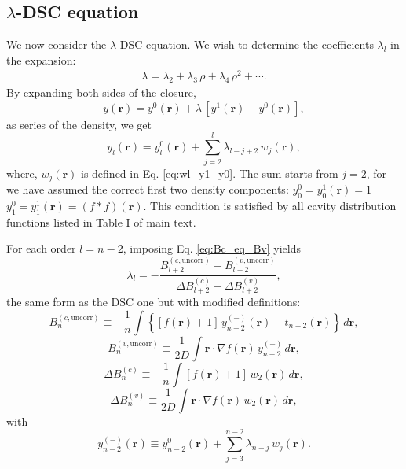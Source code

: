 \documentclass[aip,jcp,preprint,superscriptaddress,showpacs,preprintnumbers,amsmath,amssymb]{revtex4-1}
\numberwithin{equation}{section}
\newcommand{\vct}[1]{\mathbf{#1}}
\providecommand{\vr}{} %
\renewcommand{\vr}{\vct{r}}
\begin{document}
\subsection{$\lambda$-DSC equation}





We now consider the $\lambda$-DSC equation.
%
We wish to determine the coefficients $\lambda_l$
in the expansion:
%
\begin{align*}
\lambda =
\lambda_2
+
\lambda_3 \, \rho
+
\lambda_4 \, \rho^2
+ \cdots.
\end{align*}
%
By expanding both sides of the closure,
%
\begin{equation}
y(\vr) =
y^0(\vr) + \lambda \,
\left[ y^1(\vr) - y^0(\vr) \right],
\label{eq:yr_linear01}
\end{equation}
%
as series of the density, we get
%
\begin{equation*}
y_l(\vr)
=
y_l^0(\vr)
+
\sum_{j = 2}^l
\lambda_{l - j + 2} \, w_j(\vr),
\end{equation*}
%
where,
$w_j(\vr)$ is defined in Eq. \eqref{eq:wl_y1_y0}.
%
The sum starts from $j = 2$,
for we have assumed
the correct first two density components:
%
$y_0^0 = y_0^1(\vr) = 1$
%
$y_1^0 = y_1^1(\vr) = (f*f)(\vr)$.
%
This condition is satisfied by
all cavity distribution functions listed
in Table I of main text.



For each order $l = n - 2$,
imposing Eq. \eqref{eq:Bc_eq_Bv} yields
%
\begin{equation}
\lambda_l =
-\frac{ B_{l+2}^{(c, \mathrm{uncorr})}
      - B_{l+2}^{(v, \mathrm{uncorr})} }
      { \Delta B_{l+2}^{(c)}
      - \Delta B_{l+2}^{(v)} },
\label{eq:lambdadsc_lambda}
\end{equation}
%
the same form as the DSC one
but with modified definitions:
%
%
%
\begin{equation}
B_n^{(c, \mathrm{uncorr})}
\equiv
-\frac{1}{n}
\int
\left\{
  \left[ f(\vr) + 1 \right] \, y_{n-2}^{(-)}(\vr)
  - t_{n-2}(\vr)
\right\}
\, d\vr,
\label{eq:lambdadsc_Bc}
\end{equation}
%
\begin{equation}
B_n^{(v, \mathrm{uncorr})}
\equiv
\frac{1}{2D}
\int
\vr \cdot \nabla f(\vr) \, y_{n-2}^{(-)} \, d\vr,
\label{eq:lambdadsc_Bv}
\end{equation}
%
\begin{equation}
\Delta B_n^{(c)}
\equiv
-\frac{1}{n}
\int
\left[ f(\vr) + 1 \right] \, w_2(\vr) \, d\vr,
\label{eq:lambdadsc_dBc}
\end{equation}
%
\begin{equation}
\Delta B_n^{(v)}
\equiv
\frac{1}{2D}
\int
\vr \cdot \nabla f(\vr) \, w_2(\vr) \, d\vr,
\label{eq:lambdadsc_dBv}
\end{equation}
%
with
%
\[
y_{n-2}^{(-)}(\vr)
\equiv
y_{n-2}^0(\vr)
+
\sum_{j=3}^{n-2}
\lambda_{n-j} \, w_j(\vr).
\]
\end{document}

